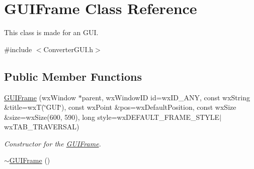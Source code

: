 \hypertarget{classGUIFrame}{
\section{GUIFrame Class Reference}
\label{classGUIFrame}
}


This class is made for an GUI.  




{\ttfamily \#include $<$ConverterGUI.h$>$}

\subsection*{Public Member Functions}
\begin{DoxyCompactItemize}
\item 
\hypertarget{classGUIFrame_ac61faa30a1422e83528be5a877aeddc8}{
\hyperlink{classGUIFrame_ac61faa30a1422e83528be5a877aeddc8}{GUIFrame} (wxWindow $\ast$parent, wxWindowID id=wxID\_\-ANY, const wxString \&title=wxT(\char`\"{}GUI\char`\"{}), const wxPoint \&pos=wxDefaultPosition, const wxSize \&size=wxSize(600, 590), long style=wxDEFAULT\_\-FRAME\_\-STYLE$|$wxTAB\_\-TRAVERSAL)}
\label{classGUIFrame_ac61faa30a1422e83528be5a877aeddc8}

\begin{DoxyCompactList}\small\item\em Constructor for the \hyperlink{classGUIFrame}{GUIFrame}. \item\end{DoxyCompactList}\item 
\hypertarget{classGUIFrame_a1e078f7765a8aa753101fd4e0cc0e0b0}{
\hyperlink{classGUIFrame_a1e078f7765a8aa753101fd4e0cc0e0b0}{$\sim$GUIFrame} ()}
\label{classGUIFrame_a1e078f7765a8aa753101fd4e0cc0e0b0}


\end{DoxyCompactItemize}
